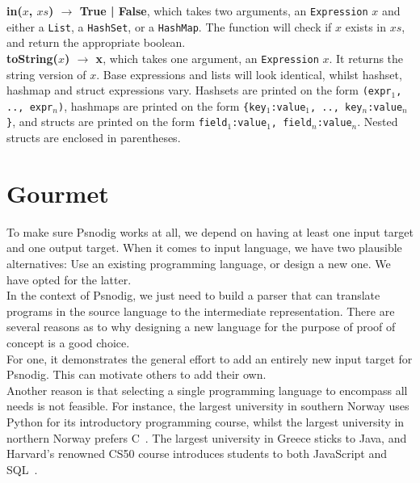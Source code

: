 \textbf{in($x$, $xs$) $\xrightarrow{}$ True | False}, which takes two arguments, an \texttt{Expression} $x$ and either a \texttt{List}, a \texttt{HashSet}, or a \texttt{HashMap}. The function will check if $x$ exists in $xs$, and return the appropriate boolean. \\

\textbf{toString($x$) $\xrightarrow{}$ x}, which takes one argument, an \texttt{Expression} $x$. It returns the string version of $x$. Base expressions and lists will look identical, whilst hashset, hashmap and struct expressions vary. Hashsets are printed on the form \texttt{(expr$_1$, .., expr$_n$)}, hashmaps are printed on the form \texttt{\{key$_1$:value$_1$, .., key$_n$:value$_n$\}}, and structs are printed on the form \texttt{field$_1$:value$_1$, field$_n$:value$_n$}. Nested structs are enclosed in parentheses. \\


\section{Gourmet}

To make sure Psnodig works at all, we depend on having at least one input target and one output target. When it comes to input language, we have two plausible alternatives: Use an existing programming language, or design a new one. We have opted for the latter. \\

In the context of Psnodig, we just need to build a parser that can translate programs in the source language to the intermediate representation. There are several reasons as to why designing a new language for the purpose of proof of concept is a good choice. \\

For one, it demonstrates the general effort to add an entirely new input target for Psnodig. This can motivate others to add their own. \\

Another reason is that selecting a single programming language to encompass all needs is not feasible. For instance, the largest university in southern Norway uses Python for its introductory programming course, whilst the largest university in northern Norway prefers C~\cite{pythonHosUIO, cHosUIT}. The largest university in Greece sticks to Java, and Harvard's renowned CS50 course introduces students to both JavaScript and SQL~\cite{javaIHellas, javaScriptOgSQLhosHarvard}. \\

